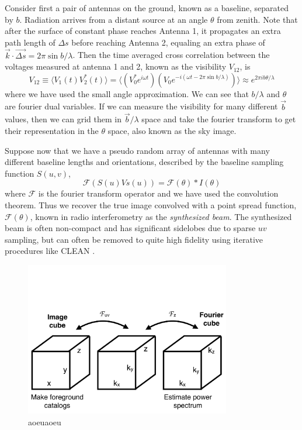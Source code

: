 Consider first a pair of antennas on the ground, known as a baseline, separated by $b$. Radiation arrives from a distant source at an angle $\theta$ from zenith. Note that after the surface of constant phase reaches Antenna 1, it propagates an extra path length of $\Delta s$ before reaching Antenna 2, equaling an extra phase of $\vec{k}\cdot \vec{\Delta s}=2\pi\sin b/\lambda$. Then the time averaged cross correlation between the voltages measured at antenna 1 and 2, known as the visibility $V_{12}$, is
\begin{equation}
	V_{12}\equiv\langle V_1(t)V_2^*(t)\rangle=\langle(V_0^* e^{i\omega t})(V_0e^{-i(\omega t-2\pi\sin b/\lambda)})\rangle \approx e^{2\pi i b\theta/\lambda}
\end{equation}
where we have used the small angle approximation. We can see that $b/\lambda$ and $\theta$ are fourier dual variables. If we can measure the visibility for many different $\vec{b}$ values, then we can grid them in $\vec{b}/\lambda$ space and take the fourier transform to get their representation in the $\theta$ space, also known as the sky image.

Suppose now that we have a pseudo random array of antennas with many different baseline lengths and orientations, described by the baseline sampling function $S(u,v)$, 
\begin{equation}
	 \mathcal{F}(S(u)Vs(u))=\mathcal{F}(\theta)\ast I(\theta)
\end{equation}
where $\mathcal{F}$ is the fourier transform operator and we have used the convolution theorem. Thus we recover the true image convolved with a point spread function, $\mathcal{F}(\theta)$, known in radio interferometry as the \textit{synthesized beam}. The synthesized beam is often non-compact and has significant sidelobes due to sparse $uv$ sampling, but can often be removed to quite high fidelity using iterative procedures like CLEAN \citep{hogbomclean}.

\begin{figure}[h]
    \centering
    \includegraphics[width=0.8\textwidth]{chap0_intro/ifo_space.pdf}
    \caption[Representation of the relation between image space, fourier space, and interferometer space]{aoeuaoeu}
    \label{fig:ifospace}
\end{figure}




